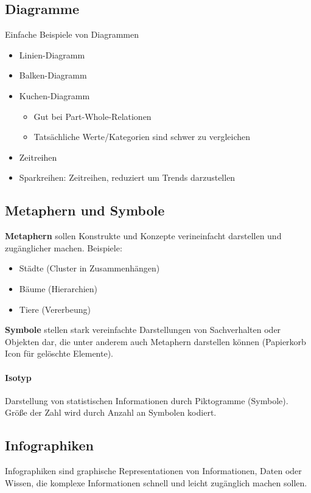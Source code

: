 \documentclass[ngerman]{scrartcl}
\begin{document}
\subsection{Diagramme}

Einfache Beispiele von Diagrammen
\begin{itemize}
  \item Linien-Diagramm
  \item Balken-Diagramm
  \item Kuchen-Diagramm
  \begin{itemize}
    \item Gut bei Part-Whole-Relationen
    \item Tatsächliche Werte/Kategorien sind schwer zu vergleichen
  \end{itemize}
  \item Zeitreihen
  \item Sparkreihen: Zeitreihen, reduziert um Trends darzustellen
\end{itemize}


\subsection{Metaphern und Symbole}
\textbf{Metaphern} sollen Konstrukte und Konzepte verineinfacht darstellen und zugänglicher machen. Beispiele:
\begin{itemize}
  \item Städte (Cluster in Zusammenhängen)
  \item Bäume (Hierarchien)
  \item Tiere (Vererbeung)
\end{itemize}

\textbf{Symbole} stellen stark vereinfachte Darstellungen von Sachverhalten oder Objekten dar, die unter anderem auch Metaphern darstellen können (Papierkorb Icon für gelöschte Elemente).

\paragraph{Isotyp} Darstellung von statistischen Informationen durch Piktogramme (Symbole). Größe der Zahl wird durch Anzahl an Symbolen kodiert.

\subsection{Infographiken}
Infographiken sind graphische Representationen von Informationen, Daten oder Wissen, die komplexe Informationen schnell und leicht zugänglich machen sollen.
\end{document}
